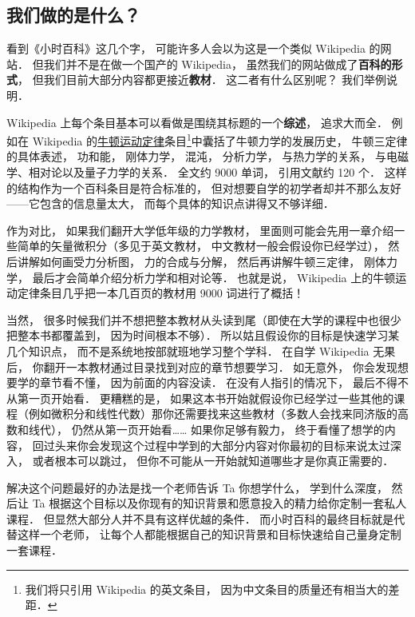 
\subsection{我们做的是什么？}
看到《小时百科》这几个字， 可能许多人会以为这是一个类似 Wikipedia 的网站． 但我们并不是在做一个国产的 Wikipedia， 虽然我们的网站做成了\textbf{百科的形式}， 但我们目前大部分内容都更接近\textbf{教材}． 这二者有什么区别呢？ 我们举例说明．

Wikipedia 上每个条目基本可以看做是围绕其标题的一个\textbf{综述}， 追求大而全． 例如在 Wikipedia 的\href{https://en.wikipedia.org/wiki/Newton's_laws_of_motion}{牛顿运动定律}条目\footnote{我们将只引用 Wikipedia 的英文条目， 因为中文条目的质量还有相当大的差距．}中囊括了牛顿力学的发展历史， 牛顿三定律的具体表述， 功和能， 刚体力学， 混沌， 分析力学， 与热力学的关系， 与电磁学、相对论以及量子力学的关系． 全文约 9000 单词， 引用文献约 120 个． 这样的结构作为一个百科条目是符合标准的， 但对想要自学的初学者却并不那么友好——它包含的信息量太大， 而每个具体的知识点讲得又不够详细．

作为对比， 如果我们翻开大学低年级的力学教材， 里面则可能会先用一章介绍一些简单的矢量微积分（多见于英文教材， 中文教材一般会假设你已经学过）， 然后讲解如何画受力分析图， 力的合成与分解， 然后再讲解牛顿三定律， 刚体力学， 最后才会简单介绍分析力学和相对论等． 也就是说， Wikipedia 上的牛顿运动定律条目几乎把一本几百页的教材用 9000 词进行了概括！

当然， 很多时候我们并不想把整本教材从头读到尾（即使在大学的课程中也很少把整本书都覆盖到， 因为时间根本不够）． 所以姑且假设你的目标是快速学习某几个知识点， 而不是系统地按部就班地学习整个学科． 在自学 Wikipedia 无果后， 你翻开一本教材通过目录找到对应的章节想要学习． 如无意外， 你会发现想要学的章节看不懂， 因为前面的内容没读． 在没有人指引的情况下， 最后不得不从第一页开始看． 更糟糕的是， 如果这本书开始就假设你已经学过一些其他的课程（例如微积分和线性代数）那你还需要找来这些教材（多数人会找来同济版的高数和线代）， 仍然从第一页开始看…… 如果你足够有毅力， 终于看懂了想学的内容， 回过头来你会发现这个过程中学到的大部分内容对你最初的目标来说太过深入， 或者根本可以跳过， 但你不可能从一开始就知道哪些才是你真正需要的．

解决这个问题最好的办法是找一个老师告诉 Ta 你想学什么， 学到什么深度， 然后让 Ta 根据这个目标以及你现有的知识背景和愿意投入的精力给你定制一套私人课程． 但显然大部分人并不具有这样优越的条件． 而小时百科的最终目标就是代替这样一个老师， 让每个人都能根据自己的知识背景和目标快速给自己量身定制一套课程．

